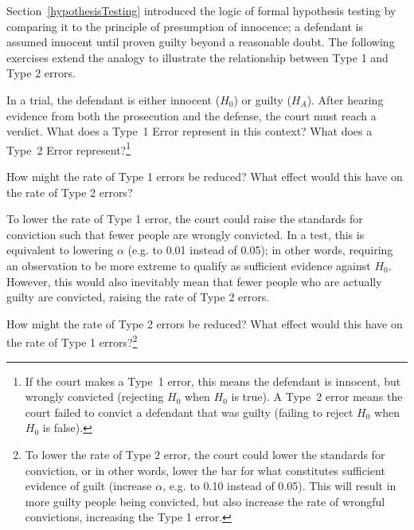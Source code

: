 \begin{spacing}{1.5}
Section~\ref{hypothesisTesting} introduced the logic of formal hypothesis testing by comparing it to the principle of presumption of innocence; a defendant is assumed innocent until proven guilty beyond a reasonable doubt. The following exercises extend the analogy to illustrate the relationship between Type 1 and Type 2 errors.

\begin{exercise} \label{whatAreTheErrorTypesInUSCourts}
	In a trial, the defendant is either innocent ($H_0$) or guilty ($H_A$). After hearing evidence from both the prosecution and the defense, the court must reach a verdict. What does a Type~1 Error represent in this context? What does a Type~2 Error represent?\footnote{If the court makes a Type~1 error, this means the defendant is innocent, but wrongly convicted (rejecting $H_0$ when $H_0$ is true). A Type~2 error means the court failed to convict a defendant that was guilty (failing to reject $H_0$ when $H_0$ is false).}
\end{exercise}

\begin{example}{How might the rate of Type 1 errors be reduced? What effect would this have on the rate of Type 2 errors?}
	
	To lower the rate of Type 1 error, the court could raise the standards for conviction such that fewer people are wrongly convicted. In a test, this is equivalent to lowering $\alpha$ (e.g. to 0.01 instead of 0.05); in other words, requiring an observation to be more extreme to qualify as sufficient evidence against $H_0$. However, this would also inevitably mean that fewer people who are actually guilty are convicted, raising the rate of Type 2 errors.
\end{example}

\begin{exercise} \label{howToReduceType2ErrorsInUSCourts}
	How might the rate of Type 2 errors be reduced? What effect would this have on the rate of Type 1 errors?\footnote{To lower the rate of Type 2 error, the court could lower the standards for conviction, or in other words, lower the bar for what constitutes sufficient evidence of guilt (increase $\alpha$, e.g. to 0.10 instead of 0.05). This will result in more guilty people being convicted, but also increase the rate of wrongful convictions, increasing the Type 1 error.}
\end{exercise}



\end{spacing}
